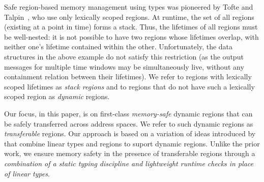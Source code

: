 Safe region-based memory management using types was
pioneered by Tofte and Talpin~\cite{tofte94,tofte97}, who 
use only lexically scoped regions.  At runtime, the set of all regions
(existing at a point in time) forms a stack. Thus, the lifetimes of
all regions must be well-nested: it is not possible to have two
regions whose lifetimes overlap, with neither one's lifetime contained
within the other.  Unfortunately, the data structures in the above
example do not satisfy this restriction (as the output messages for
multiple time windows may be simultaneously live, without any
containment relation between their lifetimes).  We refer to regions
with lexically scoped lifetimes as \emph{stack regions} and to regions
that do not have such a lexically scoped region as \emph{dynamic}
regions.

Our focus, in this paper, is on first-class \emph{memory-safe} dynamic regions
that can be safely transferred across address spaces. We refer to such dynamic
regions as \emph{transferable} regions.
%
Our approach is based on a variation of ideas introduced by~\cite{WW01,cyclone04}
that combine linear types and regions to suport dynamic regions.
Unlike the prior work, we ensure memory safety in the presence of
transferable regions through a \emph{combination of a static
typing discipline and lightweight runtime checks in place of linear types}.

